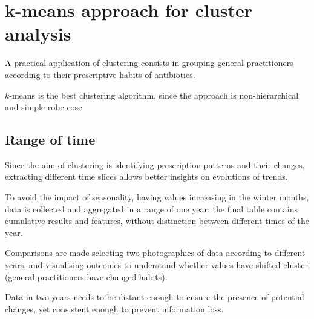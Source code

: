 \chapter{k-means approach for cluster analysis}




A practical application of clustering consists in grouping general practitioners according to their prescriptive habits of antibiotics.

$k$-means is the best clustering algorithm, since the approach is non-hierarchical and simple robe cose

\section{Range of time}
Since the aim of clustering is identifying prescription patterns and their changes, extracting different time slices allows better insights on evolutions of trends.

To avoid the impact of seasonality, having values increasing in the winter months, data is collected and aggregated in a range of one year: the final table contains cumulative results and features, without distinction between different times of the year.

Comparisons are made selecting two photographies of data according to different years, and visualising outcomes to understand whether values have shifted cluster (general practitioners have changed habits).

Data in two years needs to be distant enough to ensure the presence of potential changes, yet consistent enough to prevent information loss. 

